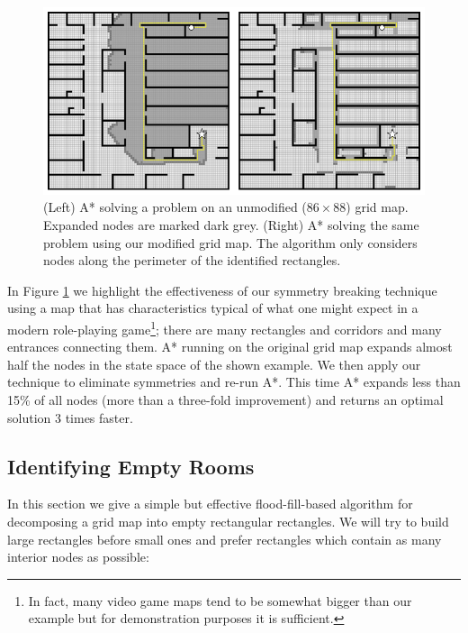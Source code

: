 \begin{figure}[t]
\centering
\includegraphics[width=0.95\columnwidth, trim = 10mm 10mm 10mm 0mm]{chapter_rsr/diagrams/rsr_example.png}
\caption{(Left) A* solving a problem on an unmodified ($86\times88$) grid map. 
Expanded nodes are marked dark grey.
(Right) A* solving the same problem using our modified grid map. 
The algorithm only considers nodes along the perimeter of the identified rectangles.}
\label{fig::rsr::contrast}
\end{figure}

In Figure \ref{fig::rsr::contrast} we highlight the effectiveness of our symmetry breaking technique using
a map that has characteristics typical of what one might expect in a modern role-playing game\footnote{
In fact, many video game maps tend to be somewhat bigger than our example but for demonstration 
purposes it is sufficient.};
there are many rectangles and corridors and many entrances connecting them.
A* running on the original grid map expands almost half the nodes
in the state space of the shown example.
We then apply our technique to eliminate symmetries and re-run A*.
This time A* expands less than 15\% of all nodes (more than a three-fold
improvement) and returns an optimal solution 3 times faster.

\subsection{Identifying Empty Rooms}
\label{cha::rsr::rectangles}
In this section we give a simple but effective flood-fill-based algorithm for decomposing a 
grid map into empty rectangular rectangles.
We will try to build large rectangles before small ones and prefer rectangles which
contain as many interior nodes as possible:

